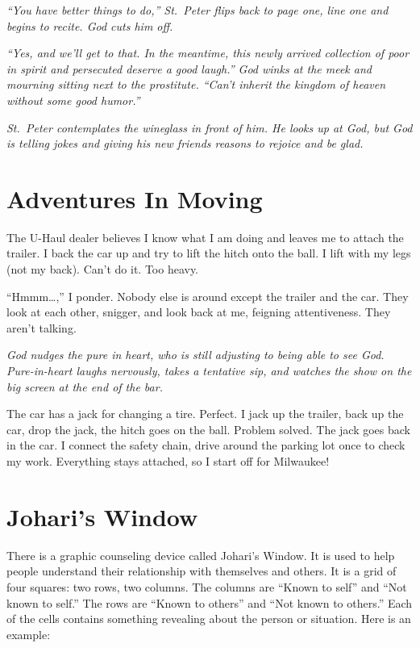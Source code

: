 \documentclass[
  letterpaper,
  DIV=11,
  numbers=noendperiod]{scrreprt}
\begin{document}
\emph{``You have better things to do,'' St.~Peter flips back to page
one, line one and begins to recite. God cuts him off.}

\emph{``Yes, and we'll get to that. In the meantime, this newly arrived
collection of poor in spirit and persecuted deserve a good laugh.'' God
winks at the meek and mourning sitting next to the prostitute. ``Can't
inherit the kingdom of heaven without some good humor.''}

\emph{St.~Peter contemplates the wineglass in front of him. He looks up
at God, but God is telling jokes and giving his new friends reasons to
rejoice and be glad.}

\section*{Adventures In Moving}\label{adventures-in-moving}


The U-Haul dealer believes I know what I am doing and leaves me to
attach the trailer. I back the car up and try to lift the hitch onto the
ball. I lift with my legs (not my back). Can't do it. Too heavy.

``Hmmm\ldots,'' I ponder. Nobody else is around except the trailer and
the car. They look at each other, snigger, and look back at me, feigning
attentiveness. They aren't talking.

\emph{God nudges the pure in heart, who is still adjusting to being able
to see God. Pure-in-heart laughs nervously, takes a tentative sip, and
watches the show on the big screen at the end of the bar.}

The car has a jack for changing a tire. Perfect. I jack up the trailer,
back up the car, drop the jack, the hitch goes on the ball. Problem
solved. The jack goes back in the car. I connect the safety chain, drive
around the parking lot once to check my work. Everything stays attached,
so I start off for Milwaukee!

\section*{Johari's Window}\label{joharis-window}


There is a graphic counseling device called Johari's Window. It is used
to help people understand their relationship with themselves and others.
It is a grid of four squares: two rows, two columns. The columns are
``Known to self'' and ``Not known to self.'' The rows are ``Known to
others'' and ``Not known to others.'' Each of the cells contains
something revealing about the person or situation. Here is an example:
\end{document}
